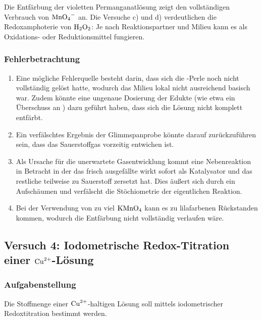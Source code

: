 Die Entfärbung der violetten Permanganatlösung zeigt den vollständigen Verbrauch von $\ce{MnO4^-}$ an. Die Versuche c) und d) verdeutlichen die Redoxamphoterie von $\ce{H2O2}$: Je nach Reaktionspartner und Milieu kann es als Oxidations- oder Reduktionsmittel fungieren.\cite{skript}

\subsubsection{Fehlerbetrachtung}
\begin{enumerate}[label=\textbf{\alph*)}]
    \item Eine mögliche Fehlerquelle besteht darin, dass sich die -Perle noch nicht vollständig gelöst hatte, wodurch das Milieu lokal nicht ausreichend basisch war. Zudem könnte eine ungenaue Dosierung der Edukte (wie etwa ein Überschuss an ) dazu geführt haben, dass sich die Lösung nicht komplett entfärbt.
    \item Ein verfälschtes Ergebnis der Glimmspanprobe könnte darauf zurückzuführen sein, dass das Sauerstoffgas vorzeitig entwichen ist.
    \item Als Ursache für die unerwartete Gasentwicklung kommt eine Nebenreaktion in Betracht in der das frisch ausgefällte  wirkt sofort als Katalysator und das restliche  teilweise zu Sauerstoff zersetzt hat. Dies äußert sich durch ein Aufschäumen und verfälscht die Stöchiometrie der eigentlichen Reaktion.
    \item Bei der Verwendung von zu viel $\ce{KMnO4}$ kann es zu lilafarbenen Rückstanden kommen, wodurch die Entfärbung nicht vollständig verlaufen wäre.
\end{enumerate}


\subsection{Versuch 4: Iodometrische Redox-Titration einer $\ce{Cu^{2+}}$-Lösung}

\subsubsection{Aufgabenstellung}
Die Stoffmenge einer $\ce{Cu^{2+}}$-haltigen Lösung soll mittels iodometrischer Redoxtitration bestimmt werden.

